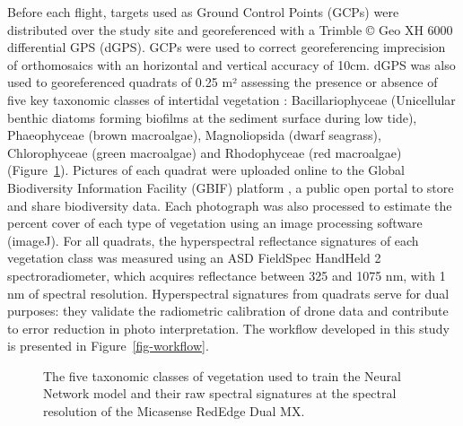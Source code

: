 \documentclass[
  number]{elsarticle}
\begin{document}
Before each flight, targets used as Ground Control Points (GCPs) were
distributed over the study site and georeferenced with a Trimble © Geo
XH 6000 differential GPS (dGPS). GCPs were used to correct
georeferencing imprecision of orthomosaics with an horizontal and
vertical accuracy of 10cm. dGPS was also used to georeferenced quadrats
of 0.25 m² assessing the presence or absence of five key taxonomic
classes of intertidal vegetation : Bacillariophyceae (Unicellular
benthic diatoms forming biofilms at the sediment surface during low
tide), Phaeophyceae (brown macroalgae), Magnoliopsida (dwarf seagrass),
Chlorophyceae (green macroalgae) and Rhodophyceae (red macroalgae)
(Figure~\ref{fig-vegetation}). Pictures of each quadrat were uploaded
online to the Global Biodiversity Information Facility (GBIF) platform
\citep{BedeGbif}, a public open portal to store and share biodiversity
data. Each photograph was also processed to estimate the percent cover
of each type of vegetation using an image processing software (imageJ).
For all quadrats, the hyperspectral reflectance signatures of each
vegetation class was measured using an ASD FieldSpec HandHeld 2
spectroradiometer, which acquires reflectance between 325 and 1075 nm,
with 1 nm of spectral resolution. Hyperspectral signatures from quadrats
serve for dual purposes: they validate the radiometric calibration of
drone data and contribute to error reduction in photo interpretation.
The workflow developed in this study is presented in
Figure~\ref{fig-workflow}.

\label{cell-fig-vegetation}
\begin{figure}[H]


\caption{\label{fig-vegetation}The five taxonomic classes of vegetation
used to train the Neural Network model and their raw spectral signatures
at the spectral resolution of the Micasense RedEdge Dual MX.}

\end{figure}%
\end{document}
